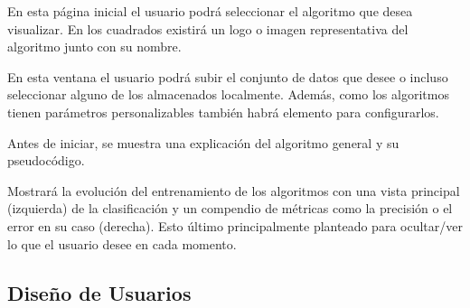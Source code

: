 
En esta página inicial el usuario podrá seleccionar el algoritmo que desea
visualizar. En los cuadrados existirá un logo o imagen representativa del
algoritmo junto con su nombre.


En esta ventana el usuario podrá subir el conjunto de datos que desee o incluso
seleccionar alguno de los almacenados localmente. Además, como los algoritmos
tienen parámetros personalizables también habrá elemento para configurarlos.

Antes de iniciar, se muestra una explicación del algoritmo general y su
pseudocódigo.



Mostrará la evolución del entrenamiento de los algoritmos con una vista
principal (izquierda) de la clasificación y un compendio de métricas como la
precisión o el error en su caso (derecha). Esto último principalmente planteado
para ocultar/ver lo que el usuario desee en cada momento.

\subsection{Diseño de Usuarios}

